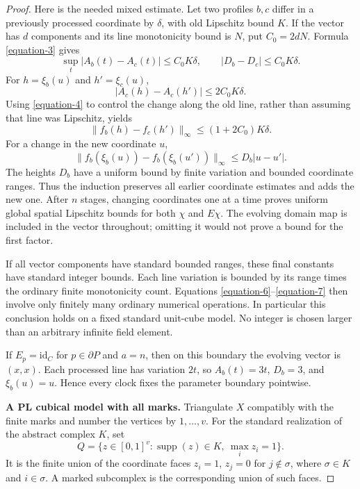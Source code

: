 \documentclass[11pt,a4paper]{article}
\theoremstyle{definition}
\begin{document}
\begin{proof}
Here is the needed mixed estimate. Let two profiles $b,c$
differ in a previously processed coordinate by $\delta$,
with old Lipschitz bound $K$. If the vector has $d$
components and its line monotonicity bound is $N$, put
$C_0=2dN$. Formula \eqref{equation-3} gives
\[
 \sup_t|A_b(t)-A_c(t)|\le C_0K\delta,\qquad
 |D_b-D_c|\le C_0K\delta.
\]
For $h=\xi_b(u)$ and $h'=\xi_c(u)$,
\[
 |A_c(h)-A_c(h')|\le2C_0K\delta.
\]
Using \eqref{equation-4} to control the change along the old line,
rather than assuming that line was Lipschitz, yields
\begin{equation}
 \|f_b(h)-f_c(h')\|_\infty
       \le(1+2C_0)K\delta.
 \label{equation-6}
\end{equation}
For a change in the new coordinate $u$,
\begin{equation}
 \|f_b(\xi_b(u))-f_b(\xi_b(u'))\|_\infty
       \le D_b|u-u'|.
 \label{equation-7}
\end{equation}
The heights $D_b$ have a uniform bound by finite variation
and bounded coordinate ranges. Thus the induction preserves
all earlier coordinate estimates and adds the new one.
After $n$ stages, changing coordinates one at a time proves
uniform global spatial Lipschitz bounds for both $\chi$
and $E\chi$. The evolving domain map is included in the
vector throughout; omitting it would not prove a bound
for the first factor.

If all vector components have standard bounded ranges,
these final constants have standard integer bounds.
Each line variation is bounded by its range times the
ordinary finite monotonicity count. Equations \eqref{equation-6}--\eqref{equation-7}
then involve only finitely many ordinary numerical operations.
In particular this conclusion holds on a fixed standard
unit-cube model. No integer is chosen larger than an
arbitrary infinite field element.

If $E_p=\mathrm{id}_C$ for $p\in\partial P$ and $a=n$,
then on this boundary the evolving vector is $(x,x)$.
Each processed line has variation $2t$, so $A_b(t)=3t$,
$D_b=3$, and $\xi_b(u)=u$. Hence every clock fixes the
parameter boundary pointwise.

\textbf{A PL cubical model with all marks.}\quad
Triangulate $X$ compatibly with the finite marks and number
the vertices by $1,\ldots,v$. For the standard realization
of the abstract complex $K$, set
\begin{equation}
 Q=\{z\in[0,1]^v:
       \operatorname{supp}(z)\in K,\ \max_i z_i=1\}.
 \label{equation-8}
\end{equation}
It is the finite union of the coordinate faces
$z_i=1$, $z_j=0$ for $j\notin\sigma$, where
$\sigma\in K$ and $i\in\sigma$. A marked subcomplex is
the corresponding union of such faces.


\end{proof}
\end{document}
